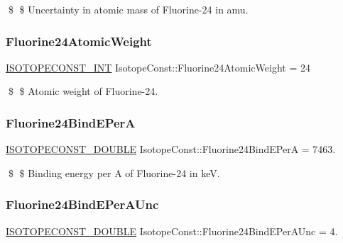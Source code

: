 \$ \$ Uncertainty in atomic mass of Fluorine-\/24 in amu. \mbox{\label{group___isotope_const-_fluorine-_f24_gabb83b3c48365e84c41af903704f29370}} 
\subsubsection{\texorpdfstring{Fluorine24\+Atomic\+Weight}{Fluorine24AtomicWeight}}
{\footnotesize\ttfamily \mbox{\hyperlink{group___isotope_const-_macros_ga5f18360b3e99483a35c32d789e62621c}{I\+S\+O\+T\+O\+P\+E\+C\+O\+N\+S\+T\+\_\+\+I\+NT}} Isotope\+Const\+::\+Fluorine24\+Atomic\+Weight = 24}

\$ \$ Atomic weight of Fluorine-\/24. \mbox{\label{group___isotope_const-_fluorine-_f24_gaec58a0ed6955392b0e88e5a9b56b6312}} 
\subsubsection{\texorpdfstring{Fluorine24\+Bind\+E\+PerA}{Fluorine24BindEPerA}}
{\footnotesize\ttfamily \mbox{\hyperlink{group___isotope_const-_macros_ga8f45a7272ce02c0b4c65c44636ed719a}{I\+S\+O\+T\+O\+P\+E\+C\+O\+N\+S\+T\+\_\+\+D\+O\+U\+B\+LE}} Isotope\+Const\+::\+Fluorine24\+Bind\+E\+PerA = 7463.}

\$ \$ Binding energy per A of Fluorine-\/24 in keV. \mbox{\label{group___isotope_const-_fluorine-_f24_ga7454266cd58dfc605e9d4352ab06d650}} 
\subsubsection{\texorpdfstring{Fluorine24\+Bind\+E\+Per\+A\+Unc}{Fluorine24BindEPerAUnc}}
{\footnotesize\ttfamily \mbox{\hyperlink{group___isotope_const-_macros_ga8f45a7272ce02c0b4c65c44636ed719a}{I\+S\+O\+T\+O\+P\+E\+C\+O\+N\+S\+T\+\_\+\+D\+O\+U\+B\+LE}} Isotope\+Const\+::\+Fluorine24\+Bind\+E\+Per\+A\+Unc = 4.}

